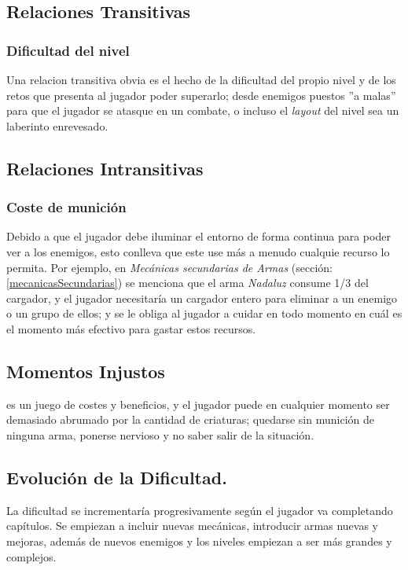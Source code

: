     \subsection{Relaciones Transitivas}
        \subsubsection{Dificultad del nivel}
            Una relacion transitiva obvia es el hecho de la dificultad del propio nivel y de los retos que presenta al jugador poder superarlo; desde enemigos puestos ''a malas'' para que el jugador se atasque en un combate, o incluso el \textit{layout} del nivel sea un laberinto enrevesado.

    \subsection{Relaciones Intransitivas}
        \subsubsection{Coste de munición}
        Debido a que el jugador debe iluminar el entorno de forma continua para poder ver a los enemigos, esto conlleva que este use más a menudo cualquie recurso lo permita. Por ejemplo, en \textit{Mecánicas secundarias de Armas} (sección: \ref{mecanicasSecundarias}) se menciona que el arma \textit{Nadaluz} consume 1/3 del cargador, y el jugador necesitaría un cargador entero para eliminar a un enemigo o un grupo de ellos; y se le obliga al jugador a cuidar en todo momento en cuál es el momento más efectivo para gastar estos recursos.
    \subsection{Momentos Injustos}
        \TWD es un juego de costes y beneficios, y el jugador puede en cualquier momento ser demasiado abrumado por la cantidad de criaturas; quedarse sin munición de ninguna arma, ponerse nervioso y no saber salir de la situación.
    \subsection{Evolución de la Dificultad.}
        La dificultad se incrementaría progresivamente según el jugador va completando capítulos. Se empiezan a incluir nuevas mecánicas, introducir armas nuevas y mejoras, además de nuevos enemigos y los niveles empiezan a ser más grandes y complejos.

